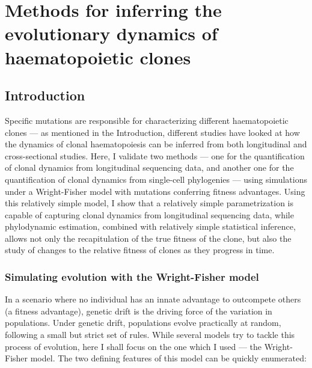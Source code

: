 \chapter{Methods for inferring the evolutionary dynamics of haematopoietic clones}

\section{Introduction}

Specific mutations are responsible for characterizing different haematopoietic clones --- as mentioned in the Introduction, different studies have looked at how the dynamics of clonal haematopoiesis can be inferred from both longitudinal and cross-sectional studies. Here, I validate two methods --- one for the quantification of clonal dynamics from longitudinal sequencing data, and another one for the quantification of clonal dynamics from single-cell phylogenies --- using simulations under a Wright-Fisher model with mutations conferring fitness advantages. Using this relatively simple model, I show that a relatively simple parametrization is capable of capturing clonal dynamics from longitudinal sequencing data, while phylodynamic estimation, combined with relatively simple statistical inference, allows not only the recapitulation of the true fitness of the clone, but also the study of changes to the relative fitness of clones as they progress in time.

\subsection{Simulating evolution with the Wright-Fisher model}

In a scenario where no individual has an innate advantage to outcompete others (a fitness advantage), genetic drift is the driving force of the variation in populations. Under genetic drift, populations evolve practically at random, following a small but strict set of rules. While several models try to tackle this process of evolution, here I shall focus on the one which I used --- the Wright-Fisher model. The two defining features of this model can be quickly enumerated:

